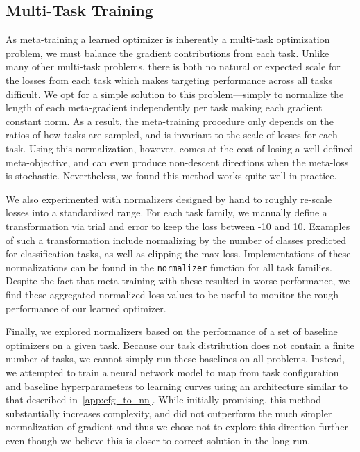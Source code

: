 \documentclass[11pt]{article}
\begin{document}
\subsection{Multi-Task Training} \label{app:hand_designed_normalizer}
As meta-training a learned optimizer is inherently a multi-task optimization problem, we must balance the gradient contributions from each task.
Unlike many other multi-task problems, there is both no natural or expected scale for the losses from each task which makes targeting performance across all tasks difficult. 
We opt for a simple solution to this problem---simply to normalize the length of each meta-gradient independently per task making each gradient constant norm.
As a result, the meta-training procedure only depends on the ratios of how tasks are sampled, and is invariant to the scale of losses for each task. 
Using this normalization, however, comes at the cost of losing a well-defined meta-objective, and can even produce non-descent directions when the meta-loss is stochastic.
Nevertheless, we found this method works quite well in practice. 

We also experimented with normalizers designed by hand to roughly re-scale losses into a standardized range. For each task family, we manually define a transformation via trial and error to keep the loss between -10 and 10. Examples of such a transformation include normalizing by the number of classes predicted for classification tasks, as well as clipping the max loss. Implementations of these normalizations can be found in the \texttt{normalizer} function for all task families.
Despite the fact that meta-training with these resulted in worse performance, we find these aggregated normalized loss values to be useful to monitor the rough performance of our learned optimizer. 

Finally, we explored normalizers based on the performance of a set of baseline optimizers on a given task. Because our task distribution does not contain a finite number of tasks, we cannot simply run these baselines on all problems.
Instead, we attempted to train a neural network model to map from task configuration and baseline hyperparameters to learning curves using an architecture similar to that described in~\ref{app:cfg_to_nn}.
While initially promising, this method substantially increases complexity, and did not outperform the much simpler normalization of gradient and thus we chose not to explore this direction further even though we believe this is closer to correct solution in the long run.
\end{document}

